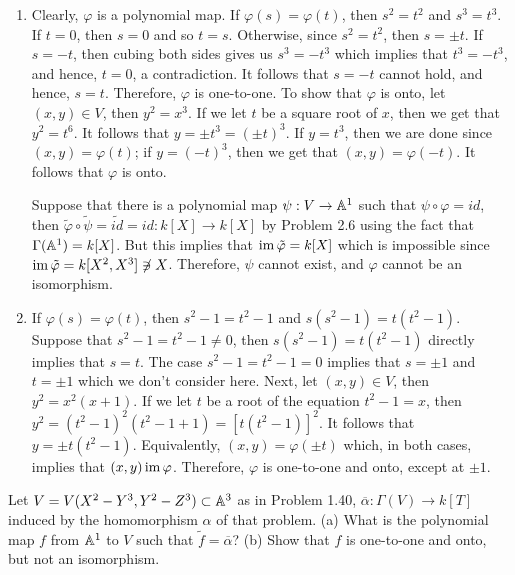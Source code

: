 \begin{solution}
    \begin{enumerate}[label=(\alph*)]
        \item Clearly, $\varphi$ is a polynomial map. If $\varphi(s) = \varphi(t)$, then $s^2 = t^2$ and $s^3 = t^3$. If $t = 0$, then $s = 0$ and so $t = s$. Otherwise, since $s^2 = t^2$, then $s = \pm t$. If $s = -t$, then cubing both sides gives us $s^3 = -t^3$ which implies that $t^3 = -t^3$, and hence, $t = 0$, a contradiction. It follows that $s = -t$ cannot hold, and hence, $s = t$. Therefore, $\varphi$ is one-to-one. To show that $\varphi$ is onto, let $(x,y) \in V$, then $y^2 = x^3$. If we let $t$ be a square root of $x$, then we get that $y^2 = t^6$. It follows that $y = \pm t^3 = (\pm t)^3$. If $y = t^3$, then we are done since $(x,y) = \varphi(t)$; if $y = (-t)^3$, then we get that $(x,y) = \varphi(-t)$. It follows that $\varphi$ is onto.
    
        Suppose that there is a polynomial map $\psi : V \to \mathbb{A}^1$ such that $\psi \circ \varphi = id$, then $\tilde{\varphi} \circ \tilde{\psi} = \tilde{id} = id : k[X] \to k[X]$ by Problem 2.6 using the fact that $ \Gamma(\mathbb{A}^1) = k[X]$. But this implies that $\operatorname{im} \tilde{\varphi} = k[X]$ which is impossible since $\operatorname{im} \tilde{\varphi} = k[X^2, X^3] \not \ni X$. Therefore, $\psi$ cannot exist, and $\varphi$ cannot be an isomorphism.
        \item If $\varphi(s) = \varphi(t)$, then $s^2 - 1 = t^2 - 1$ and $s(s^2 - 1) = t(t^2 - 1)$. Suppose that $s^2 - 1 = t^2 - 1 \neq 0$, then $s(s^2 - 1) = t(t^2 - 1)$ directly implies that $s = t$. The case $s^2 - 1 = t^2 - 1 = 0$ implies that $s = \pm 1$ and $t = \pm 1$ which we don't consider here. Next, let $(x,y) \in V$, then $y^2 = x^2(x+1)$. If we let $t$ be a root of the equation $t^2 - 1 = x$, then $y^2 = (t^2 - 1)^2(t^2 - 1 +1) = [t(t^2 - 1)]^2$. It follows that $y = \pm t(t^2 - 1)$. Equivalently, $(x,y) = \varphi(\pm t)$ which, in both cases, implies that $(x,y) \operatorname{im} \varphi$. Therefore, $\varphi$ is one-to-one and onto, except at $\pm 1$.
    \end{enumerate}
\end{solution}

\begin{exercise}
    Let $V = V(X^2 - Y^3, Y^2 - Z^3) \subset \mathbb{A}^3$ as in Problem 1.40, $\overline{\alpha} : \Gamma(V) \to k[T]$ induced by the homomorphism $\alpha$ of that problem. (a) What is the polynomial map $f$ from $\mathbb{A}^1$ to $V$ such that $\tilde{f} = \overline{\alpha}$? (b) Show that $f$ is one-to-one and onto, but not an isomorphism. \\
\end{exercise}

